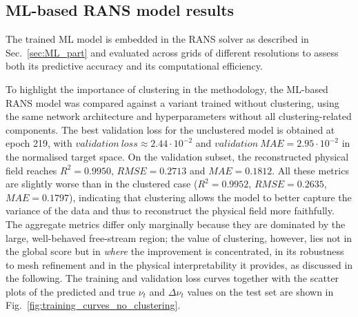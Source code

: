 \subsection{ML-based RANS model results}
\label{sec:ml_rans_results}
The trained ML model is embedded in the RANS solver as described in Sec.~\ref{sec:ML_part} and evaluated across grids of different resolutions to assess both its predictive accuracy and its computational efficiency.

To highlight the importance of clustering in the methodology, the ML-based RANS model was compared against a variant trained without clustering, using the same network architecture and hyperparameters without all clustering-related components. The best validation loss for the unclustered model is obtained at epoch 219, with $validation\ loss \approx 2.44\cdot10^{-2}$ and $validation\ MAE = 2.95\cdot10^{-2}$ in the normalised target space. On the validation subset, the reconstructed physical field reaches $R^2 = 0.9950$, $RMSE = 0.2713$ and $MAE = 0.1812$. All these metrics are slightly worse than in the clustered case ($R^2 = 0.9952$, $RMSE = 0.2635$, $MAE = 0.1797$), indicating that clustering allows the model to better capture the variance of the data and thus to reconstruct the physical field more faithfully. The aggregate metrics differ only marginally because they are dominated by the large, well-behaved free-stream region; the value of clustering, however, lies not in the global score but in \emph{where} the improvement is concentrated, in its robustness to mesh refinement and in the physical interpretability it provides, as discussed in the following. The training and validation loss curves together with the scatter plots of the predicted and true $\nu_t$ and $\Delta \nu_t$ values on the test set are shown in Fig.~\ref{fig:training_curves_no_clustering}.

